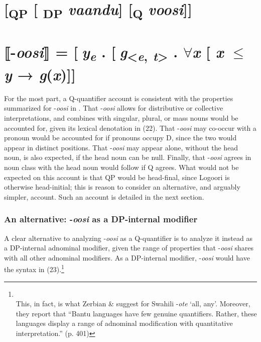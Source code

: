\documentclass[output=paper]{langsci/langscibook}
\begin{document}
\chapter[      [QP [ DP vaandu{]} [Q voosi{]}{]}]{      [\textsubscript{QP} [\textsubscript{ DP} \textit{vaandu}] [\textsubscript{Q }\textit{voosi}]]}
\chapter[      ⟦{}-oosi⟧ = [ye . [g{\textless}e, t{\textgreater}  . ${\forall}$x [ x ${\leq}$ y → g(x){]}{]}]{      ⟦{}-\textit{oosi}⟧ = [\textit{y}\textit{\textsubscript{e}} . [\textit{g}\textsubscript{{\textless}}\textit{\textsubscript{e}}\textsubscript{, }\textit{\textsubscript{t}}\textsubscript{{\textgreater}}\textit{  }. ${\forall}$\textit{x }[ \textit{x} ${\leq}$\textit{ y} → \textit{g}(\textit{x})]]}

For the most part, a Q-quantifier account is consistent with the properties summarized for -\textit{oosi }in . That -\textit{oosi} allows for distributive or collective interpretations, and combines with singular, plural, or mass nouns would be accounted for, given its lexical denotation in (22). That -\textit{oosi} may co-occur with a pronoun would be accounted for if pronouns occupy D, since the two would appear in distinct positions. That -\textit{oosi} may appear alone, without the head noun, is also expected, if the head noun can be null. Finally, that -\textit{oosi} agrees in noun class with the head noun would follow if Q agrees. What would not be expected on this account is that QP would be head-final, since Logoori is otherwise head-initial; this is reason to consider an alternative, and arguably simpler, account. Such an account is detailed in the next section.

\subsection{An alternative: -\textit{oosi} as a DP-internal modifier}

A clear alternative to analyzing -\textit{oosi }as a Q-quantifier is to analyze it instead as a DP-internal adnominal modifier, given the range of properties that -\textit{oosi} shares with all other adnominal modifiers. As a DP-internal modifier, -\textit{oosi} would have the syntax in (23).\footnote{\\
 This, in fact, is what Zerbian \& \citet{Krifka2008} suggest for Swahili -\textit{ote} ‘all, any’. Moreover, they report that “Bantu languages have few genuine quantifiers. Rather, these languages display a range of adnominal modification with quantitative interpretation.” (p. 401)} 
\end{document}
